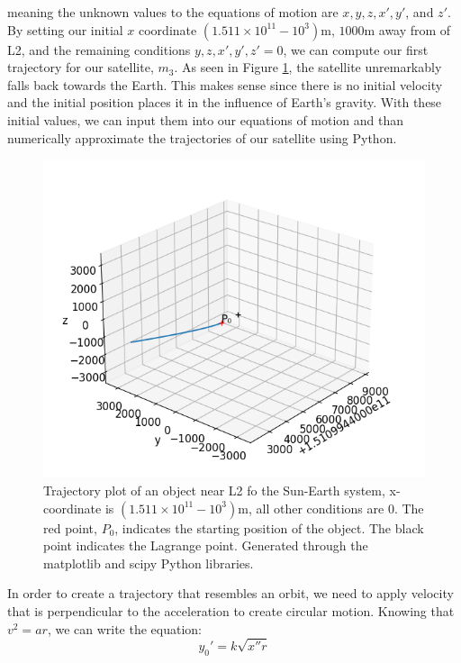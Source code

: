 meaning the unknown values to the equations of motion are $x, y, z, x', y'$, and $z'$.
By setting our initial $x$ coordinate $(1.511\times10^{11} - 10^3)\si{\metre}$, $1000\si{\metre}$ away from of L2, and the remaining conditions $y, z, x', y', z' = 0$, we can compute our first trajectory for our satellite, $m_3$.
As seen in Figure \ref{fig:3dplot1}, the satellite unremarkably falls back towards the Earth.
This makes sense since there is no initial velocity and the initial position places it in the influence of Earth's gravity.
With these initial values, we can input them into our equations of motion and than numerically approximate the trajectories of our satellite using Python.
\newpage
\begin{samepage}
\begin{figure}[ht!]
	\centering
	\includegraphics[scale=0.52]{figures/xyzplot1.png}
	\caption{Trajectory plot of an object near L2 fo the Sun-Earth system, x-coordinate is $(1.511\times10^{11} - 10^3)\si{\metre}$, all other conditions are 0.
		The red point, $P_0$, indicates the starting position of the object.
		The black point indicates the Lagrange point.
		Generated through the matplotlib and scipy Python libraries.
	}
	\label{fig:3dplot1}
\end{figure}
In order to create a trajectory that resembles an orbit, we need to apply velocity that is perpendicular to the acceleration to create circular motion.
Knowing that $v^2 = ar$, we can write the equation:
\begin{equation*}
	y_0' = k\sqrt{x''r}

\end{equation*}
\end{samepage}
